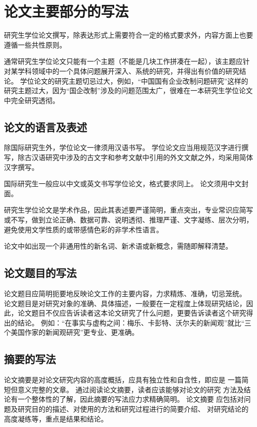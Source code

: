 
\chapter{论文主要部分的写法}

研究生学位论文撰写，除表达形式上需要符合一定的格式要求外，内容方面上也要遵循一些共性原则。

通常研究生学位论文只能有一个主题（不能是几块工作拼凑在一起），该主题应针对某学科领域中的一个具体问题展开深入、系统的研究，并得出有价值的研究结论。
学位论文的研究主题切忌过大，例如，“中国国有企业改制问题研究”这样的研究主题过大，因为“国企改制”涉及的问题范围太广，很难在一本研究生学位论文中完全研究透彻。

\section{论文的语言及表述}

除国际研究生外，学位论文一律须用汉语书写。
学位论文应当用规范汉字进行撰写，除古汉语研究中涉及的古文字和参考文献中引用的外文文献之外，均采用简体汉字撰写。

国际研究生一般应以中文或英文书写学位论文，格式要求同上。
论文须用中文封面。

研究生学位论文是学术作品，因此其表述要严谨简明，重点突出，专业常识应简写或不写，做到立论正确、数据可靠、说明透彻、推理严谨、文字凝练、层次分明，避免使用文学性质的或带感情色彩的非学术性语言。

论文中如出现一个非通用性的新名词、新术语或新概念，需随即解释清楚。

\section{论文题目的写法}

论文题目应简明扼要地反映论文工作的主要内容，力求精炼、准确，切忌笼统。
论文题目是对研究对象的准确、具体描述，一般要在一定程度上体现研究结论，因此，论文题目不仅应告诉读者这本论文研究了什么问题，更要告诉读者这个研究得出的结论。
例如：“在事实与虚构之间：梅乐、卡彭特、沃尔夫的新闻观”就比“三个美国作家的新闻观研究”更专业、更准确。

\section{摘要的写法}

论文摘要是对论文研究内容的高度概括，应具有独立性和自含性，即应是 一篇简短但意义完整的文章。
通过阅读论文摘要，读者应该能够对论文的研究 方法及结论有一个整体性的了解，因此摘要的写法应力求精确简明。
论文摘要 应包括对问题及研究目的的描述、对使用的方法和研究过程进行的简要介绍、 对研究结论的高度凝练等，重点是结果和结论。

